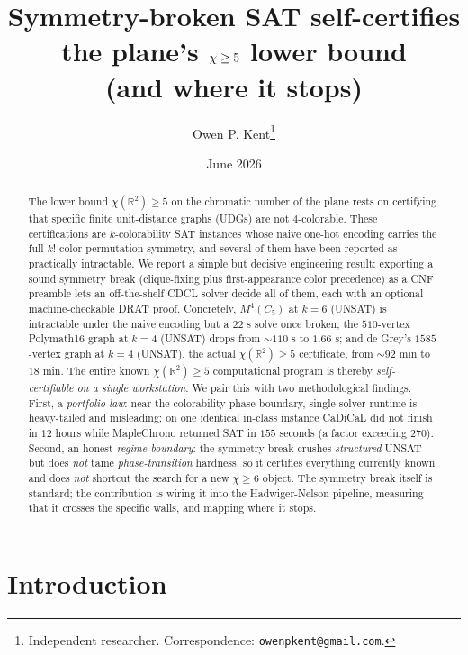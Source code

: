 \documentclass[11pt]{article}
\title{Symmetry-broken SAT self-certifies the plane's
  $\chrom \ge 5$ lower bound\\(and where it stops)}
\author{Owen P. Kent\thanks{Independent researcher.
  Correspondence: \texttt{owenpkent@gmail.com}.}}
\date{June 2026}
\theoremstyle{definition}
\newcommand{\R}{\mathbb{R}}
\newcommand{\chrom}{\chi}
\begin{document}
\maketitle

\begin{abstract}
The lower bound $\chrom(\R^2) \ge 5$ on the chromatic number of the plane rests
on certifying that specific finite unit-distance graphs (UDGs) are not
$4$-colorable. These certifications are $k$-colorability SAT instances whose
naive one-hot encoding carries the full $k!$ color-permutation symmetry, and
several of them have been reported as practically intractable. We report a simple
but decisive engineering result: exporting a sound symmetry break (clique-fixing
plus first-appearance color precedence) as a CNF preamble lets an off-the-shelf
CDCL solver decide all of them, each with an optional machine-checkable DRAT
proof. Concretely, $M^4(C_5)$ at $k=6$ (UNSAT) is intractable under the naive
encoding but a $22$ s solve once broken; the $510$-vertex Polymath16 graph at
$k=4$ (UNSAT) drops from $\sim\!110$ s to $1.66$ s; and de Grey's $1585$-vertex
graph at $k=4$ (UNSAT), the actual $\chrom(\R^2) \ge 5$ certificate, from
$\sim\!92$ min to $18$ min. The entire known
$\chrom(\R^2) \ge 5$ computational program is thereby \emph{self-certifiable on a
single workstation}. We pair this with two methodological findings. First, a
\emph{portfolio law}: near the colorability phase boundary, single-solver runtime
is heavy-tailed and misleading; on one identical in-class instance CaDiCaL did not
finish in $12$ hours while MapleChrono returned SAT in $155$ seconds (a factor
exceeding $270$). Second, an honest \emph{regime boundary}: the symmetry
break crushes \emph{structured} UNSAT but does \emph{not} tame
\emph{phase-transition} hardness, so it certifies everything currently known and
does \emph{not} shortcut the search for a new $\chrom \ge 6$ object. The symmetry
break itself is standard; the contribution is wiring it into the
Hadwiger-Nelson pipeline, measuring that it crosses the specific walls, and
mapping where it stops.
\end{abstract}

\section{Introduction}
\label{sec:intro}
\end{document}
